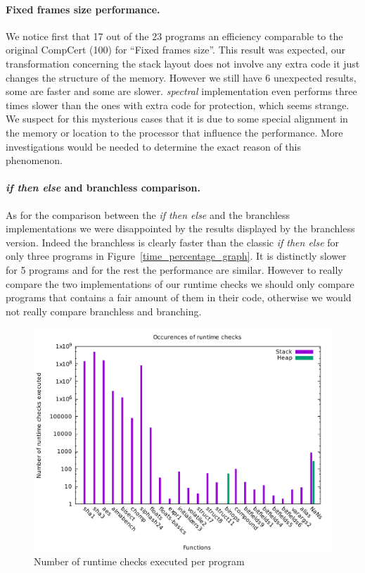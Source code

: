 \documentclass[11pt]{sdm}
\begin{document}
\paragraph{Fixed frames size performance.}
\label{par:Fixed frames size}
We notice first that 17 out of the 23 programs an efficiency comparable to the original CompCert (100) for ``Fixed frames size''. This result was expected, our transformation concerning the stack layout does not involve any extra code it just changes the structure of the memory. However we still have 6 unexpected results, some are faster and some are slower. \textit{spectral} implementation even performs three times slower than the ones with extra code for protection, which seems strange. We suspect for this mysterious cases that it is due to some special alignment in the memory or location to the processor that influence the performance. More investigations would be needed to determine the exact reason of this phenomenon.

\paragraph{\textit{if then else} and branchless comparison.}
\label{par:ifthenelsevsbranchless}
As for the comparison between the \textit{if then else} and the branchless implementations we were disappointed by the results displayed by the branchless version. Indeed the branchless is clearly faster than the classic \textit{if then else} for only three programs in Figure~\ref{time_percentage_graph}. It is distinctly slower for 5 programs and for the rest the performance are similar. However to really compare the two implementations of our runtime checks we should only compare programs that contains a fair amount of them in their code, otherwise we would not really compare branchless and branching.

\begin{figure}[!ht]
\centering
\includegraphics[width=1\textwidth]{images/occurence_graph.pdf}
\caption{Number of runtime checks executed per program}
\label{occurence_graph}
\end{figure}
\end{document}
